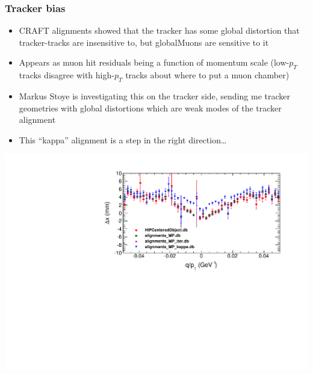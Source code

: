 \documentclass[compress]{beamer}
\begin{document}

\begin{frame}
\frametitle{Tracker bias}

\scriptsize
\begin{itemize}
\item CRAFT alignments showed that the tracker has some global distortion that tracker-tracks are insensitive to, but globalMuons are sensitive to it
\item Appears as muon hit residuals being a function of momentum scale (low-$p_T$ tracks disagree with high-$p_T$ tracks about where to put a muon chamber)
\item Markus Stoye is investigating this on the tracker side, sending
  me tracker geometries with global distortions which are weak modes
  of the tracker alignment
\item This ``kappa'' alignment is a step in the right direction\ldots
\end{itemize}

\includegraphics[width=0.9\linewidth]{mptrackeralignments_allthree.pdf}
\end{frame}
\end{document}
